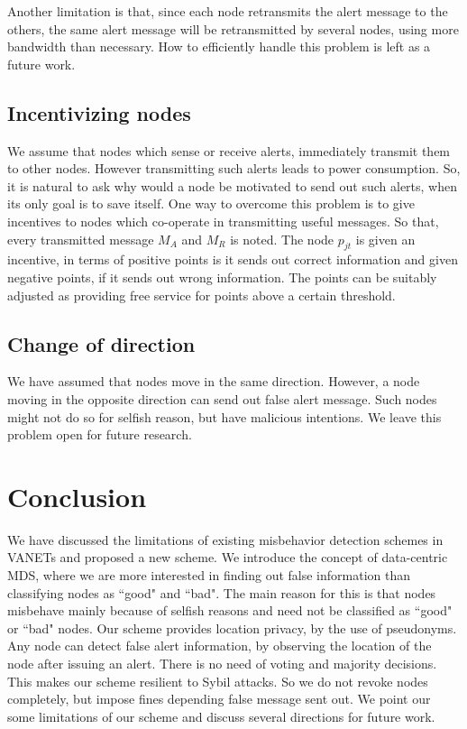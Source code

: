 \documentclass[conference]{IEEEtran}[10pt]
\begin{document}
Another limitation is that, since each node retransmits the alert message to the others, 
the same alert message will be retransmitted by several nodes, using more bandwidth than necessary. 
How to efficiently handle this problem is left as a future work. 

\subsection{Incentivizing nodes}
We assume that nodes which sense or receive alerts, immediately transmit them to other nodes. 
However transmitting such alerts leads to power consumption.
So, it is natural to ask why would a node be motivated to send out such alerts, when its only goal is to save itself. 
One way to overcome this problem is to give incentives to nodes which co-operate in 
transmitting useful messages. 
So that, every transmitted message $M_A$ and $M_R$ is noted. 
The node $p_{jt}$ is given an incentive, in terms of positive points is it sends out correct information and
given negative points, if it sends out wrong information. 
The points can be suitably adjusted as providing free service for points above a certain threshold. 

\subsection{Change of direction}
We have assumed that nodes move in the same direction. However, a node moving in the opposite direction can send  out
false alert message. Such nodes might not do so for selfish reason, but have malicious intentions. 
We leave this problem open for future research. 

\section{Conclusion}
\label{sec:conclusion}
We have discussed the limitations of existing misbehavior detection schemes in VANETs and proposed a new scheme.
We introduce the concept of data-centric MDS, where we are more interested in finding out
false information than classifying nodes as ``good" and ``bad". 
The main reason for this is that nodes misbehave mainly because of selfish reasons and 
need not be classified as ``good" or ``bad" nodes. 
Our scheme provides location privacy, by the use of pseudonyms. 
Any node can detect false alert information, by observing the location of the node after issuing an alert. 
There is no need of voting and majority decisions. 
This makes our scheme resilient to Sybil attacks. 
So we do not revoke nodes completely, but impose fines depending false message sent out. 
We point our some limitations of our scheme and discuss several directions for future work. 
\end{document}
